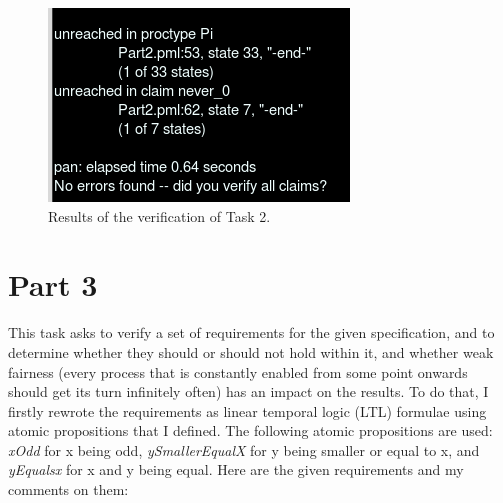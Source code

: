 \documentclass{report}
\newcommand{\tab}{\hspace*{3em}}
\begin{document}
\begin{figure} [\textwidth]
\hspace{0cm}
\includegraphics[scale=0.8]{Images/never.png}
\caption{Results of the verification of Task 2.}
\end{figure}

\section*{Part 3}
\tab This task asks to verify a set of requirements for the given specification, and to determine whether they should or should not hold within it, and whether weak fairness (every process that is constantly enabled from some point onwards should get its turn infinitely often) has an impact on the results. To do that, I firstly rewrote the requirements as linear temporal logic (LTL) formulae using atomic propositions that I defined. The following atomic propositions are used: \textit{xOdd} for x being odd, \textit{ySmallerEqualX} for y being smaller or equal to x, and \textit{yEqualsx} for x and y being equal. Here are the given requirements and my comments on them:
\end{document}
